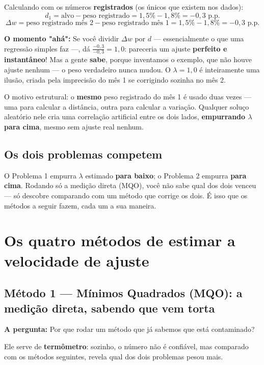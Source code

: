 \documentclass[11pt,a4paper]{article}
\newcommand{\pergunta}[1]{\par\vspace{4pt}\noindent\textbf{\color{azul}A pergunta:} #1\par\vspace{2pt}}
\newcommand{\aha}[1]{\par\vspace{4pt}\noindent\textbf{\color{vermelho}O momento "ahá":} #1\par\vspace{2pt}}
\begin{document}
Calculando com os números \textbf{registrados} (os únicos que existem nos dados):
$$d_1 = \text{alvo} - \text{peso registrado} = 1{,}5\% - 1{,}8\% = -0{,}3 \text{ p.p.}$$
$$\Delta w = \text{peso registrado mês 2} - \text{peso registrado mês 1} = 1{,}5\% - 1{,}8\% = -0{,}3 \text{ p.p.}$$

\aha{Se você dividir $\Delta w$ por $d$ --- essencialmente o que uma regressão simples faz ---,
dá $\frac{-0{,}3}{-0{,}3} = 1{,}0$: pareceria um ajuste \textbf{perfeito e instantâneo}! Mas a
gente \textbf{sabe}, porque inventamos o exemplo, que não houve ajuste nenhum --- o peso
verdadeiro nunca mudou. O $\lambda=1{,}0$ é inteiramente uma ilusão, criada pela imprecisão do
mês 1 se corrigindo sozinha no mês 2.}

O motivo estrutural: o \textbf{mesmo} peso registrado do mês 1 é usado duas vezes --- uma para
calcular a distância, outra para calcular a variação. Qualquer soluço aleatório nele cria uma
correlação artificial entre os dois lados, \textbf{empurrando $\lambda$ para cima}, mesmo sem
ajuste real nenhum.

\subsection{Os dois problemas competem}

O Problema 1 empurra $\lambda$ estimado \textbf{para baixo}; o Problema 2 empurra \textbf{para
cima}. Rodando só a medição direta (MQO), você não sabe qual dos dois venceu --- só descobre
comparando com um método que corrige os dois. É isso que os métodos a seguir fazem, cada um a
sua maneira.

\section{Os quatro métodos de estimar a velocidade de ajuste}
\label{sec:quatro}

\subsection{Método 1 --- Mínimos Quadrados (MQO): a medição direta, sabendo que vem torta}

\pergunta{Por que rodar um método que já sabemos que está contaminado?}

Ele serve de \textbf{termômetro}: sozinho, o número não é confiável, mas comparado com os
métodos seguintes, revela qual dos dois problemas pesou mais.
\end{document}

